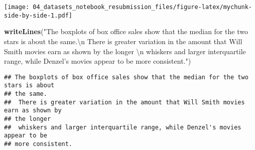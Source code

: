 \documentclass[
]{article}
\newenvironment{Shaded}{\begin{snugshade}}{\end{snugshade}}
\newcommand{\CharTok}[1]{\textcolor[rgb]{0.31,0.60,0.02}{#1}}
\newcommand{\DataTypeTok}[1]{\textcolor[rgb]{0.13,0.29,0.53}{#1}}
\newcommand{\DecValTok}[1]{\textcolor[rgb]{0.00,0.00,0.81}{#1}}
\newcommand{\KeywordTok}[1]{\textcolor[rgb]{0.13,0.29,0.53}{\textbf{#1}}}
\newcommand{\NormalTok}[1]{#1}
\newcommand{\OperatorTok}[1]{\textcolor[rgb]{0.81,0.36,0.00}{\textbf{#1}}}
\newcommand{\StringTok}[1]{\textcolor[rgb]{0.31,0.60,0.02}{#1}}
\begin{document}
\begin{Shaded}
\end{Shaded}

\texttt{[image: 04\_datasets\_notebook\_resubmission\_files/figure-latex/mychunk-side-by-side-1.pdf]}

\begin{Shaded}
\begin{Highlighting}[]
\KeywordTok{writeLines}\NormalTok{(}\StringTok{"The boxplots of box office sales show that the median for the two stars is about }
\StringTok{the same.}\CharTok{\textbackslash{}n}\StringTok{ There is greater variation in the amount that Will Smith movies earn as shown by }
\StringTok{the longer }\CharTok{\textbackslash{}n}\StringTok{ whiskers and larger interquartile range, while Denzel's movies appear to be }
\StringTok{more consistent."}\NormalTok{)}
\end{Highlighting}
\end{Shaded}

\begin{verbatim}
## The boxplots of box office sales show that the median for the two stars is about 
## the same.
##  There is greater variation in the amount that Will Smith movies earn as shown by 
## the longer 
##  whiskers and larger interquartile range, while Denzel's movies appear to be 
## more consistent.
\end{verbatim}
\end{document}
